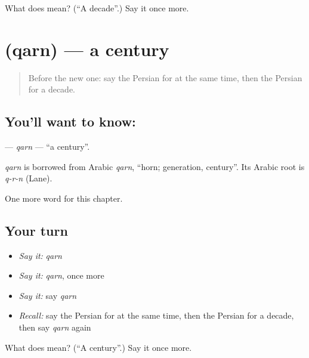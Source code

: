 \begin{tcolorbox}[breakable,colback=teal!4,colframe=teal!35!black,title={Before you move on}]
What does  mean? (\textquotedblleft{}A decade\textquotedblright{}.) Say it once more.
\end{tcolorbox}
\section[\texorpdfstring{\fa{قرن} (qarn)}{قرن (qarn)}]{ (qarn) — a century}

\label{lesson:FA-C265-qarn}



\begin{quote}
Before the new one: say the Persian for at the same time, then the Persian for a decade.
\end{quote}

\subsection*{You'll want to know: }
\textbf{} — \emph{qarn} — \textquotedblleft{}a century\textquotedblright{}.

\begin{cousinweb}
\emph{qarn} is borrowed from Arabic \emph{qarn}, \textquotedblleft{}horn; generation, century\textquotedblright{}. Its Arabic root is \emph{q-r-n} (Lane).
\end{cousinweb}

\begin{grammarlens}[title={What you've built}]
One more word for this chapter.
\end{grammarlens}

\subsection*{Your turn}
\begin{itemize}
\raggedright
  \item \emph{Say it:} \emph{qarn}
  \item \emph{Say it:} \emph{qarn}, once more
  \item \emph{Say it:} say \emph{qarn}
  \item \emph{Recall:} say the Persian for at the same time, then the Persian for a decade, then say \emph{qarn} again
\end{itemize}

\begin{tcolorbox}[breakable,colback=teal!4,colframe=teal!35!black,title={Before you move on}]
What does  mean? (\textquotedblleft{}A century\textquotedblright{}.) Say it once more.
\end{tcolorbox}
